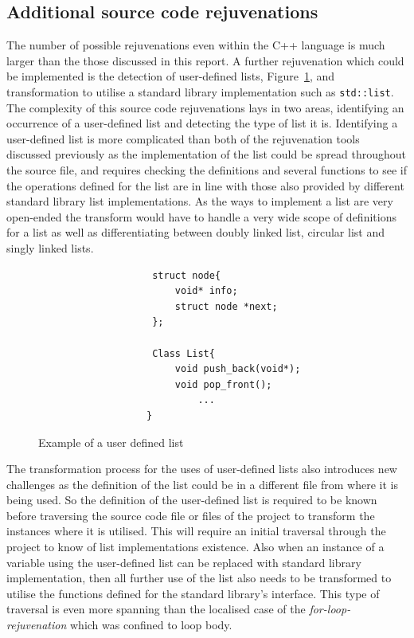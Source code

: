 \documentclass[bsc,frontabs,singlespacing,twoside,parskip,deptreport]{infthesis}
\begin{document}
\subsection{Additional source code rejuvenations}
The number of possible rejuvenations even within the C++ language is much larger than the those discussed in this report. A further rejuvenation which could be implemented is the detection of user-defined lists, Figure~\ref{fig:user-def-list}, and transformation to utilise a standard library implementation such as \texttt{std::list}. The complexity of this source code rejuvenations lays in two areas, identifying an occurrence of a user-defined list and detecting the type of list it is. Identifying a user-defined list is more complicated than both of the rejuvenation tools discussed previously as the implementation of the list could be spread throughout the source file, and requires checking the definitions and several functions to see if the operations defined for the list are in line with those also provided by different standard library list implementations. As the ways to implement a list are very open-ended the transform would have to handle a very wide scope of definitions for a list as well as differentiating between doubly linked list, circular list and singly linked lists.

\begin{figure}[htb]
    \centering
    \begin{verbatim}
                    struct node{
                        void* info;
                        struct node *next;
                    };
                    
                    Class List{
                        void push_back(void*);
                        void pop_front();
                            ...
                   }
    \end{verbatim}
    \caption{Example of a user defined list}
    \label{fig:user-def-list}
\end{figure}

The transformation process for the uses of user-defined lists also introduces new challenges as the definition of the list could be in a different file from where it is being used. So the definition of the user-defined list is required to be known before traversing the source code file or files of the project to transform the instances where it is utilised. This will require an initial traversal through the project to know of list implementations existence. Also when an instance of a variable using the user-defined list can be replaced with standard library implementation, then all further use of the list also needs to be transformed to utilise the functions defined for the standard library's interface. This type of traversal is even more spanning than the localised case of the \textit{for-loop-rejuvenation} which was confined to loop body.
\end{document}
